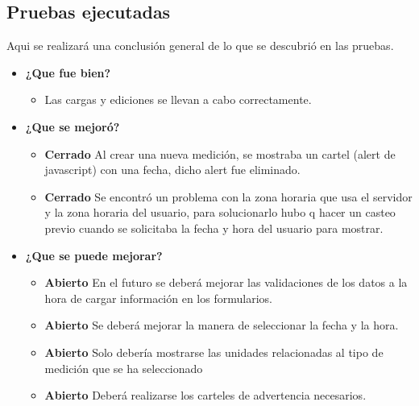\subsection{Pruebas ejecutadas}
Aqui se realizará una conclusión general de lo que se descubrió en las pruebas.
	\begin{itemize}
		\item \textbf{¿Que fue bien?}
        	\begin{itemize}
				\item        Las cargas y ediciones se llevan a cabo correctamente.
			\end{itemize}

   		\item \textbf{¿Que se mejoró?}
        	\begin{itemize}
				\item \textbf{Cerrado} Al crear una nueva medición, se mostraba un cartel (alert de javascript) con una fecha, dicho alert fue eliminado.
                \item \textbf{Cerrado} Se encontró un problema con la zona horaria que usa el servidor y la zona horaria del usuario, para solucionarlo hubo q hacer un casteo previo cuando se solicitaba la fecha y hora del usuario para mostrar.
			\end{itemize}

   		\item \textbf{¿Que se puede mejorar?}
        	\begin{itemize}
		        \item \textbf{Abierto} En el futuro se deberá mejorar las validaciones de los datos a la hora de cargar información en los formularios.
        		\item \textbf{Abierto} Se deberá mejorar la manera de seleccionar la fecha y la hora.
		        \item \textbf{Abierto} Solo debería mostrarse las unidades relacionadas al tipo de medición que se ha seleccionado  
                \item \textbf{Abierto} Deberá realizarse los carteles de advertencia necesarios.
            \end{itemize}
        

	\end{itemize}